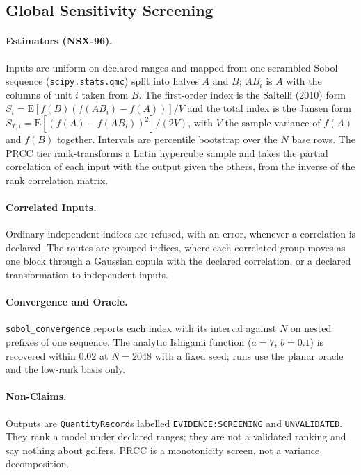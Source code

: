\documentclass[11pt,a4paper]{article}
\begin{document}
\subsection{Global Sensitivity Screening}
\label{sec:global-sensitivity}

\paragraph{Estimators (NSX-96).}  Inputs are uniform on declared ranges and
mapped from one scrambled Sobol sequence (\texttt{scipy.stats.qmc}) split into
halves $A$ and $B$; $AB_i$ is $A$ with the columns of unit $i$ taken from $B$.
The first-order index is the Saltelli (2010) form
$S_i=\mathrm{E}[f(B)(f(AB_i)-f(A))]/V$ and the total index is the Jansen form
$S_{T,i}=\mathrm{E}[(f(A)-f(AB_i))^2]/(2V)$, with $V$ the sample variance of
$f(A)$ and $f(B)$ together.  Intervals are percentile bootstrap over the $N$
base rows.  The PRCC tier rank-transforms a Latin hypercube sample and takes
the partial correlation of each input with the output given the others, from
the inverse of the rank correlation matrix.

\paragraph{Correlated Inputs.}  Ordinary independent indices are refused, with
an error, whenever a correlation is declared.  The routes are grouped indices,
where each correlated group moves as one block through a Gaussian copula with
the declared correlation, or a declared transformation to independent inputs.

\paragraph{Convergence and Oracle.}  \texttt{sobol\_convergence} reports each
index with its interval against $N$ on nested prefixes of one sequence.  The
analytic Ishigami function ($a=7$, $b=0.1$) is recovered within $0.02$ at
$N=2048$ with a fixed seed; runs use the planar oracle and the low-rank basis
only.

\paragraph{Non-Claims.}  Outputs are \texttt{QuantityRecord}s labelled
\texttt{EVIDENCE:SCREENING} and \texttt{UNVALIDATED}.  They rank a model under
declared ranges; they are not a validated ranking and say nothing about golfers.
PRCC is a monotonicity screen, not a variance decomposition.
\end{document}

